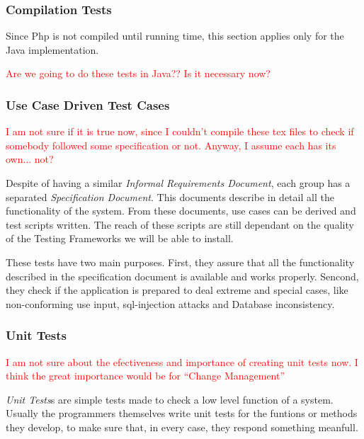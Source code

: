 \documentclass[11pt]{article}
\begin{document}
\subsubsection*{Compilation Tests}

\indent

Since Php is not compiled until running time, this section applies only for the Java implementation.

\textcolor{red}{Are we going to do these tests in Java?? Is it necessary now?}

\subsubsection*{Use Case Driven Test Cases}

\indent

\textcolor{red}{I am not sure if it is true now, since I couldn't compile these tex files to check if somebody followed some specification or not. Anyway, I assume each has its own... not?}

Despite of having a similar {\it Informal Requirements Document}, each group has a separated {\it Specification Document}. This documents describe in detail all the functionality of the system. From these documents, use cases can be derived and test scripts written. The reach of these scripts are still dependant on the quality of the Testing Frameworks we will be able to install.

These tests have two main purposes. First, they assure that all the functionality described in the specification document is available and works properly. Sencond, they check if the application is prepared to deal extreme and special cases, like non-conforming use input, sql-injection attacks and Database inconsistency.

\subsubsection*{Unit Tests}

\indent

\textcolor{red}{I am not sure about the efectiveness and importance of creating unit tests now. I think the great importance would be for ``Change Management''}

{\it Unit Tests}s are simple tests made to check a low level function of a system. Usually the programmers themselves write unit tests for the funtions or methods they develop, to make sure that, in every case, they respond something meanfull. 
\end{document}
